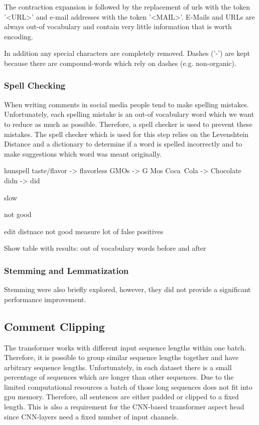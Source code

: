 
The contraction expansion is followed by the replacement of \glspl{url} with the token '<URL>' and e-mail addresses with the token '<MAIL>'. E-Mails and URLs are always out-of vocabulary and contain very little information that is worth encoding. 


In addition any special characters are completely removed. Dashes ('-') are kept because there are compound-words which rely on dashes (e.g. non-organic).

\subsubsection*{Spell Checking}
\label{sec:05_SpellChecking}
When writing comments in social media people tend to make spelling mistakes. Unfortunately, each spelling mistake is an out-of vocabulary word which we want to reduce as much as possible.
Therefore, a spell checker is used to prevent these mistakes. The spell checker which is used for this step relies on the Levenshtein Distance \cite{Levenshtein1966} and a dictionary to determine if a word is spelled incorrectly and to make suggestions which word was meant originally. 

hunspell taste/flavor -> flavorless
GMOs -> G Mos
Coca~Cola -> Chocolate
didn -> did

slow

not good

edit distnace not good measure
lot of false positives


Show table with results: out of vocabulary words before and after

\subsubsection*{Stemming and Lemmatization}

Stemming were also briefly explored, however, they did not provide a significant performance improvement.

\subsection{Comment Clipping}


The transformer works with different input sequence lengths within one batch. Therefore, it is possible to group similar sequence lengths together and have arbitrary sequence lengths. Unfortunately, in each dataset there is a small percentage of sequences which are longer than other sequences. Due to the limited computational resources a batch of those long sequences  does not fit into \gls{gpu} memory. Therefore, all sentences are either padded or clipped to a fixed length. This is also a requirement for the CNN-based transformer aspect head since CNN-layers need a fixed number of input channels.

